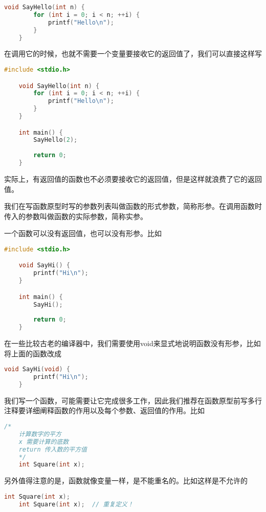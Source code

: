 \begin{lstlisting}[language=C]
    void SayHello(int n) {
        for (int i = 0; i < n; ++i) {
            printf("Hello\n");
        }
    }
\end{lstlisting}

在调用它的时候，也就不需要一个变量要接收它的返回值了，我们可以直接这样写

\begin{lstlisting}[language=C]
    #include <stdio.h>

    void SayHello(int n) {
        for (int i = 0; i < n; ++i) {
            printf("Hello\n");
        }
    }

    int main() {
        SayHello(2);
        
        return 0;
    }
\end{lstlisting}

实际上，有返回值的函数也不必须要接收它的返回值，但是这样就浪费了它的返回值。

我们在写函数原型时写的参数列表叫做函数的形式参数，简称形参。在调用函数时传入的参数叫做函数的实际参数，简称实参。

一个函数可以没有返回值，也可以没有形参。比如

\begin{lstlisting}[language=C]
    #include <stdio.h>

    void SayHi() {
        printf("Hi\n");
    }

    int main() {
        SayHi();
        
        return 0;
    }
\end{lstlisting}

在一些比较古老的编译器中，我们需要使用void来显式地说明函数没有形参，比如将上面的函数改成

\begin{lstlisting}[language=C]
    void SayHi(void) {
        printf("Hi\n");
    }
\end{lstlisting}

我们写一个函数，可能需要让它完成很多工作，因此我们推荐在函数原型前写多行注释要详细阐释函数的作用以及每个参数、返回值的作用。比如

\begin{lstlisting}[language=C]
    /*
    计算数字的平方
    x 需要计算的底数
    return 传入数的平方值
    */
    int Square(int x);
\end{lstlisting}

另外值得注意的是，函数就像变量一样，是不能重名的。比如这样是不允许的

\begin{lstlisting}[language=C]
    int Square(int x);
    int Square(int x);  // 重复定义！
\end{lstlisting}

